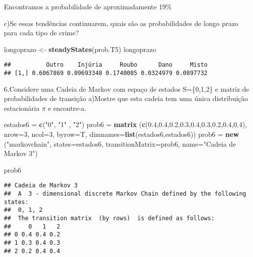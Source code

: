 \documentclass[
]{article}
\newenvironment{Shaded}{\begin{snugshade}}{\end{snugshade}}
\newcommand{\DataTypeTok}[1]{\textcolor[rgb]{0.13,0.29,0.53}{#1}}
\newcommand{\DecValTok}[1]{\textcolor[rgb]{0.00,0.00,0.81}{#1}}
\newcommand{\FloatTok}[1]{\textcolor[rgb]{0.00,0.00,0.81}{#1}}
\newcommand{\KeywordTok}[1]{\textcolor[rgb]{0.13,0.29,0.53}{\textbf{#1}}}
\newcommand{\NormalTok}[1]{#1}
\newcommand{\StringTok}[1]{\textcolor[rgb]{0.31,0.60,0.02}{#1}}
\begin{document}
Encontramos a probabilidade de aproximadamente 19\%

c)Se essas tendências continuarem, quais são as probabilidades de longo
prazo para cada tipo de crime?

\begin{Shaded}
\begin{Highlighting}[]
\NormalTok{longoprazo <-}\StringTok{ }\KeywordTok{steadyStates}\NormalTok{(prob.T5)}
\NormalTok{longoprazo}
\end{Highlighting}
\end{Shaded}

\begin{verbatim}
##          Outro    Injúria     Roubo      Dano     Misto
## [1,] 0.6067869 0.09693348 0.1740085 0.0324979 0.0897732
\end{verbatim}

6.Considere uma Cadeia de Markov com espaço de estados S=\{0,1,2\} e
matriz de probabilidades de transição a)Mostre que esta cadeia tem uma
única distribuição estacionária \(\pi\) e encontre-a.

\begin{Shaded}
\begin{Highlighting}[]
\NormalTok{estados6 =}\StringTok{ }\KeywordTok{c}\NormalTok{(}\StringTok{"0"}\NormalTok{, }\StringTok{"1"}\NormalTok{ , }\StringTok{"2"}\NormalTok{)}
\NormalTok{prob6 =}\StringTok{ }\KeywordTok{matrix}\NormalTok{ (}\KeywordTok{c}\NormalTok{(}\FloatTok{0.4}\NormalTok{,}\FloatTok{0.4}\NormalTok{,}\FloatTok{0.2}\NormalTok{,}\FloatTok{0.3}\NormalTok{,}\FloatTok{0.4}\NormalTok{,}\FloatTok{0.3}\NormalTok{,}\FloatTok{0.2}\NormalTok{,}\FloatTok{0.4}\NormalTok{,}\FloatTok{0.4}\NormalTok{),}
                \DataTypeTok{nrow=}\DecValTok{3}\NormalTok{, }\DataTypeTok{ncol=}\DecValTok{3}\NormalTok{, }\DataTypeTok{byrow=}\NormalTok{T,}
                \DataTypeTok{dimnames=}\KeywordTok{list}\NormalTok{(estados6,estados6))}
\NormalTok{prob6 =}\StringTok{ }\KeywordTok{new}\NormalTok{ (}\StringTok{"markovchain"}\NormalTok{, }\DataTypeTok{states=}\NormalTok{estados6, }\DataTypeTok{transitionMatrix=}\NormalTok{prob6, }\DataTypeTok{name=}\StringTok{"Cadeia de Markov 3"}\NormalTok{)}

\NormalTok{prob6}
\end{Highlighting}
\end{Shaded}

\begin{verbatim}
## Cadeia de Markov 3 
##  A  3 - dimensional discrete Markov Chain defined by the following states: 
##  0, 1, 2 
##  The transition matrix  (by rows)  is defined as follows: 
##     0   1   2
## 0 0.4 0.4 0.2
## 1 0.3 0.4 0.3
## 2 0.2 0.4 0.4
\end{verbatim}
\end{document}
